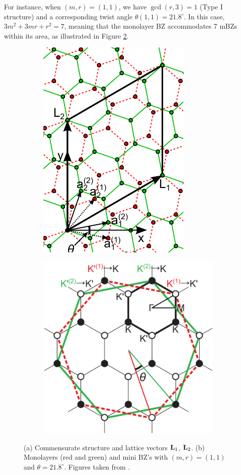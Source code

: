 For instance, when \( (m, r) = (1, 1) \), we have \( \gcd(r,3) = 1 \) (Type I structure) and a corresponding twist angle \( \theta(1,1) = 21.8^\circ \). In this case, \( 3m^2 + 3mr + r^2 = 7 \), meaning that the monolayer BZ accommodates 7 mBZs within its area, as illustrated in Figure \ref{fig:bzminibz}.

\begin{figure}[H]
\centering
\begin{subfigure}{.5\textwidth}
  \centering
  \includegraphics[height=.6\linewidth]{fig/latvec.png}
  \caption{}
  \label{fig:latvec}
\end{subfigure}%
\begin{subfigure}{.5\textwidth}
  \centering
  \includegraphics[height=.6\linewidth]{fig/bzminibz.png}
  \caption{}
  \label{fig:bzminibz}
\end{subfigure}
\caption{(a) Commensurate structure and lattice vectors $\vb{L}_1$, $\vb{L}_2$. (b) Monolayers (red and green) and mini BZ's with $(m,r) = (1,1)$ and $\theta = 21.8^\circ$. Figures taken from \cite{koshino2012}. %
}
\label{fig:geometry}
\end{figure}

